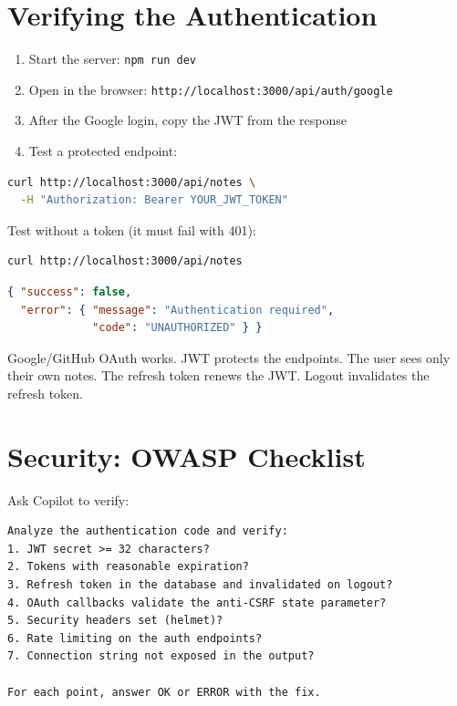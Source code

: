 \section{Verifying the Authentication}

\begin{praticabox}[title={Hands-On --- Test the OAuth flow}]
\begin{enumerate}
  \item Start the server: \texttt{npm run dev}
  \item Open in the browser: \texttt{http://localhost:3000/api/auth/google}
  \item After the Google login, copy the JWT from the response
  \item Test a protected endpoint:
\end{enumerate}
\begin{lstlisting}[language=bash]
curl http://localhost:3000/api/notes \
  -H "Authorization: Bearer YOUR_JWT_TOKEN"
\end{lstlisting}
Test without a token (it must fail with 401):
\begin{lstlisting}[language=bash]
curl http://localhost:3000/api/notes
\end{lstlisting}
\begin{lstlisting}[language=json]
{ "success": false,
  "error": { "message": "Authentication required",
             "code": "UNAUTHORIZED" } }
\end{lstlisting}
\end{praticabox}

\begin{checkpointbox}
Google/GitHub OAuth works. JWT protects the endpoints. The user sees only their own notes. The refresh token renews the JWT. Logout invalidates the refresh token.
\end{checkpointbox}

\section{Security: OWASP Checklist}

\begin{praticabox}[title={Hands-On --- Security verification}]
Ask Copilot to verify:
\begin{lstlisting}[language={}]
Analyze the authentication code and verify:
1. JWT secret >= 32 characters?
2. Tokens with reasonable expiration?
3. Refresh token in the database and invalidated on logout?
4. OAuth callbacks validate the anti-CSRF state parameter?
5. Security headers set (helmet)?
6. Rate limiting on the auth endpoints?
7. Connection string not exposed in the output?

For each point, answer OK or ERROR with the fix.
\end{lstlisting}
\end{praticabox}

